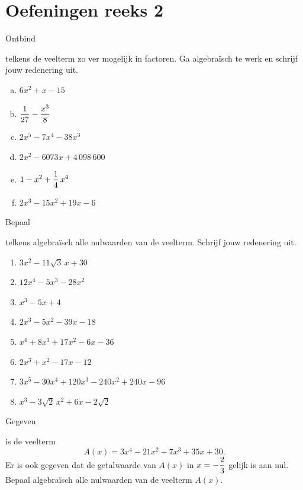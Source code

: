 \documentclass{ximera}
\begin{document}
\section*{Oefeningen reeks 2}

\begin{exercise} 
\hypertarget{oef4.5}{Ontbind} telkens de veelterm zo ver mogelijk in factoren. Ga algebra\"isch te werk en schrijf jouw redenering uit.  
\begin{multicols}{2}
\begin{enumerate}[(a)]
\item
$6x^2+x-15$
\item
$\displaystyle \frac{1}{27} - \frac{x^3}{8}$
\item
$2x^5-7x^4-38x^3$
\item
$2x^2 - 6073x + 4\,098\,600$
\item
$\displaystyle 1-x^2+\frac{1}{4}\,x^4$
\item
$2x^3 - 15x^2 + 19x - 6$
\end{enumerate}
\end{multicols}
\end{exercise} 

\begin{exercise} 
\hypertarget{oef4.6}{Bepaal} telkens algebra\"isch alle nulwaarden van de veelterm. Schrijf jouw redenering uit.
\begin{multicols}{2}
\begin{enumerate}
\item
$3x^2-11\sqrt{3}\,x+30$
\item
$12x^4-5x^3-28x^2$
\item
$x^3-5x+4$
\item
$2x^3 - 5x^2 - 39x - 18$
\item
$x^4+8x^3+17x^2-6x-36$
\item
$2x^3+x^2-17x-12$ 
\item
$3x^5-30x^4+120x^3-240x^2+240x-96$
\item
$x^3 - 3\sqrt{2}\,x^2 + 6x - 2\sqrt{2}\,$
\end{enumerate}
\end{multicols}
\end{exercise} 

\begin{exercise} 
\hypertarget{oef4.7}{Gegeven} is de veelterm
\[
A(x) = 3x^4-21x^2-7x^3+35x+30.
\]
Er is ook gegeven dat de getalwaarde van $A(x)$ in $\displaystyle x = -\frac{2}{3}$ gelijk is aan nul. Bepaal algebra\"isch alle nulwaarden van de veelterm $A(x)$.
\end{exercise} 
\end{document}
